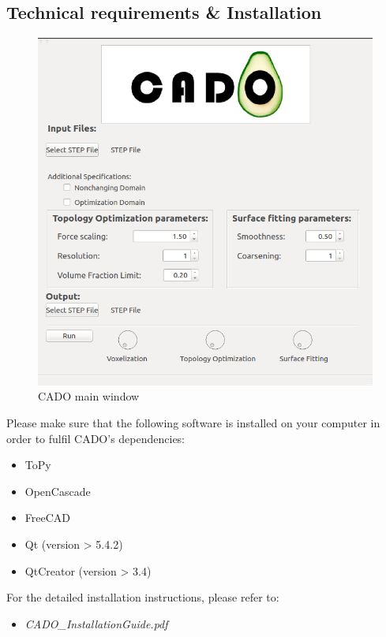 \documentclass[
12pt, %
a4paper, %
oneside, %
headinclude,footinclude, %
BCOR5mm, %
]{scrartcl}
\begin{document}
\subsection{Technical requirements \& Installation}
\begin{figure}
\centering
\includegraphics[scale=0.4]{Pictures/CADO_mainWindow.png}
\caption{CADO main window}
\label{fig:mainWindow}
\end{figure}
Please make sure that the following software is installed on your computer in order to fulfil CADO's dependencies:
\begin{itemize}
\item ToPy
\item OpenCascade
\item FreeCAD
\item Qt (version > 5.4.2)
\item QtCreator (version > 3.4) 
\end{itemize}



For the detailed installation instructions, please refer to:
\begin{itemize}
\item[] \textit{CADO{\_}InstallationGuide.pdf}
\end{itemize}
\end{document}
